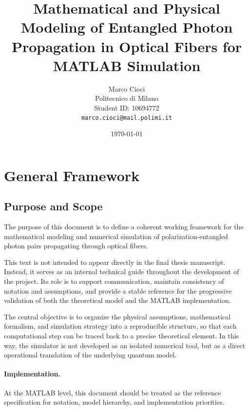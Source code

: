 \documentclass[a4paper]{article}
\title{
Mathematical and Physical Modeling of Entangled Photon Propagation in Optical Fibers for MATLAB Simulation
}
\author{
Marco Cioci\\
Politecnico di Milano\\
Student ID: 10694772\\
\texttt{marco.cioci@mail.polimi.it}
}
\date{\today}
\begin{document}
\maketitle

\tableofcontents

\medskip



\newpage
\section{General Framework}


\subsection{Purpose and Scope}

The purpose of this document is to define a coherent working framework for the mathematical modeling and numerical simulation of polarization-entangled photon pairs propagating through optical fibers.

This text is not intended to appear directly in the final thesis manuscript. Instead, it serves as an internal technical guide throughout the development of the project. Its role is to support communication, maintain consistency of notation and assumptions, and provide a stable reference for the progressive validation of both the theoretical model and the MATLAB implementation.

\medskip

The central objective is to organize the physical assumptions, mathematical formalism, and simulation strategy into a reproducible structure, so that each computational step can be traced back to a precise theoretical element. In this way, the simulator is not developed as an isolated numerical tool, but as a direct operational translation of the underlying quantum model.

\medskip

\paragraph{Implementation.}

At the MATLAB level, this document should be treated as the reference specification for notation, model hierarchy, and implementation priorities.
\end{document}

